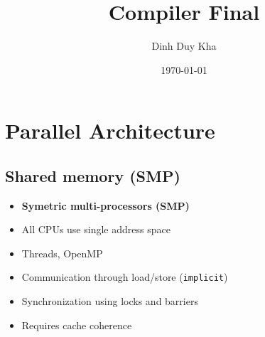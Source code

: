 \documentclass[11pt]{article}
\author{Dinh Duy Kha}
\date{\today}
\title{Compiler Final}
\begin{document}
\maketitle
\tableofcontents

\section{Parallel Architecture}
\label{sec:org001a67c}
\subsection{Shared memory (SMP)}
\label{sec:org5de21ae}
\begin{itemize}
\item \textbf{Symetric multi-processors (SMP)}
\item All CPUs use single address space
\item Threads, OpenMP
\item Communication through load/store (\texttt{implicit})
\item Synchronization using locks and barriers
\item Requires cache coherence
\end{itemize}
\end{document}
